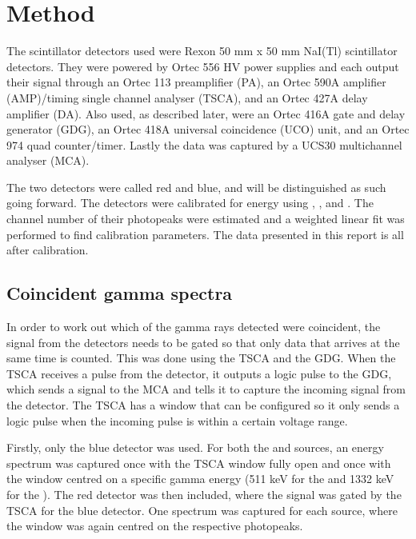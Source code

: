 \documentclass[11pt]{article}
\numberwithin{equation}{section}
\numberwithin{figure}{section}
\numberwithin{table}{section}
\begin{document}
\section{Method}\label{sec:Method}
\par The scintillator detectors used were Rexon 50 mm x 50 mm NaI(Tl) scintillator detectors. They were powered by Ortec 556 HV power supplies and each output their signal through an Ortec 113 preamplifier (PA), an Ortec 590A amplifier (AMP)/timing single channel analyser (TSCA), and an Ortec 427A delay amplifier (DA). Also used, as described later, were an Ortec 416A gate and delay generator (GDG), an Ortec 418A universal coincidence (UCO) unit, and an Ortec 974 quad counter/timer. Lastly the data was captured by a UCS30 multichannel analyser (MCA).
\par The two detectors were called red and blue, and will be distinguished as such going forward. The detectors were calibrated for energy using , , and . The channel number of their photopeaks were estimated and a weighted linear fit was performed to find calibration parameters. The data presented in this report is all after calibration. 

\subsection{Coincident gamma spectra}
\par In order to work out which of the gamma rays detected were coincident, the signal from the detectors needs to be gated so that only data that arrives at the same time is counted. This was done using the TSCA and the GDG. When the TSCA receives a pulse from the detector, it outputs a logic pulse to the GDG, which sends a signal to the MCA and tells it to capture the incoming signal from the detector. The TSCA has a window that can be configured so it only sends a logic pulse when the incoming pulse is within a certain voltage range.
\par Firstly, only the blue detector was used. For both the  and  sources, an energy spectrum was captured once with the TSCA window fully open and once with the window centred on a specific gamma energy (511 keV for the  and 1332 keV for the ). The red detector was then included, where the signal was gated by the TSCA for the blue detector. One spectrum was captured for each source, where the window was again centred on the respective photopeaks.
\end{document}
